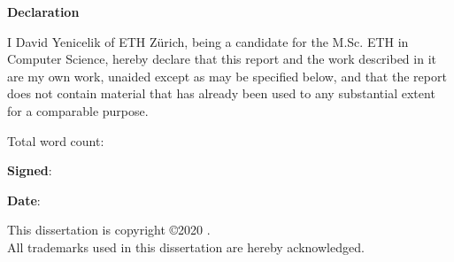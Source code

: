 \newpage
{\Huge \bf Declaration}

\vspace{24pt} 

I David Yenicelik of ETH Zürich, being a candidate for the M.Sc. ETH in
Computer Science, hereby declare that this report and the
work described in it are my own work, unaided except as may be
specified below, and that the report does not contain material that
has already been used to any substantial extent for a comparable
purpose.

\vspace{24pt}
Total word count: \wordcount

\vspace{60pt}
\textbf{Signed}: 

\vspace{12pt}
\textbf{Date}:


\vfill

This dissertation is copyright \copyright 2020 \authorname. 
\\
All trademarks used in this dissertation are hereby acknowledged.



\newpage
\vspace*{\fill}
